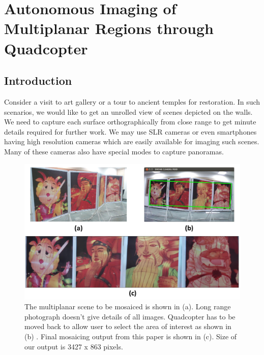 \chapter[Multiplanar Imaging]{Autonomous Imaging of Multiplanar Regions through
Quadcopter}
\label{ch:multiplanar}
\section{Introduction}
Consider a visit to art gallery or a tour to ancient temples for restoration. In
such scenarios, we would like to get an unrolled view of scenes depicted on
the walls. We need to capture each surface orthographically from close range to
get minute details required for further work. We may use SLR cameras or even
smartphones having high resolution cameras which are easily available for
imaging such scenes. Many of these cameras also have special modes to capture
panoramas.
\begin{figure}[h!]
\centering
\includegraphics[width=0.98\linewidth]{figures/multiplanar/teaser2}
\caption[Overview of multiplanar imaging]{The multiplanar scene to be mosaiced
is shown in (a).
Long range photograph doesn't give details of all images. Quadcopter has to be moved back
to allow user to select the area of interest as shown in (b) .
Final mosaicing output from this paper is shown in (c). Size of our output is
3427 x 863 pixels.}
\label{fig:teaser}
\end{figure} 

